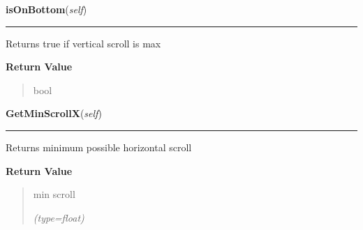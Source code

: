     \vspace{0.5ex}

\hspace{.8\funcindent}\begin{boxedminipage}{\funcwidth}

    \raggedright \textbf{isOnBottom}(\textit{self})

    \vspace{-1.5ex}

    \rule{\textwidth}{0.5\fboxrule}
\setlength{\parskip}{2ex}
    Returns true if vertical scroll is max

\setlength{\parskip}{1ex}
      \textbf{Return Value}
    \vspace{-1ex}

      \begin{quote}
      bool

      \end{quote}

    \end{boxedminipage}

    \label{ImagePanel:ImagePanel:GetMinScrollX}

    \vspace{0.5ex}

\hspace{.8\funcindent}\begin{boxedminipage}{\funcwidth}

    \raggedright \textbf{GetMinScrollX}(\textit{self})

    \vspace{-1.5ex}

    \rule{\textwidth}{0.5\fboxrule}
\setlength{\parskip}{2ex}
    Returns minimum possible horizontal scroll

\setlength{\parskip}{1ex}
      \textbf{Return Value}
    \vspace{-1ex}

      \begin{quote}
      min scroll

      {\it (type=float)}

      \end{quote}

    \end{boxedminipage}

    \label{ImagePanel:ImagePanel:GetMinScrollY}

